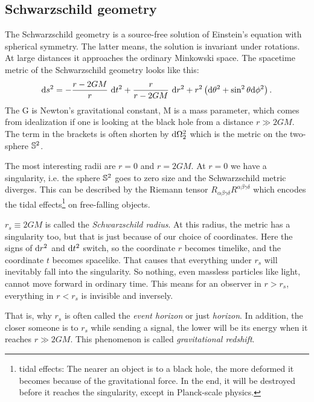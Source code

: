 \subsection{Schwarzschild geometry \checkmark}
	
	The Schwarzschild geometry is a source-free solution of Einstein's equation  with spherical symmetry. The latter means, the solution is invariant under rotations. 
	At large distances it approaches the ordinary Minkowski space.
	The spacetime metric of the Schwarzschild geometry looks like this:\\
		\begin{equation} \label{p.3 (2.1)}
		\mathrm{d} s^2=-\frac{r-2GM}{r}~ \mathrm{d} t^2+\frac{r}{r-2GM}~
		\mathrm{d} r^2+r^2 \left( \mathrm{d} \theta^2+\sin^2\theta \mathrm{d} \phi^2 \right).
		\end{equation}
	The G is Newton's gravitational constant, M is a mass parameter, which comes from idealization if one is looking at the black hole from a distance $r\gg 2GM$.
	The term in the brackets is often shorten by $\mathrm{d} \Omega_2^2$ which is the metric on the two-sphere $\mathbb{S}^2$.
	
	The most interesting radii are $r=0$ and $r=2GM$.
	At $r=0$ we have a singularity, i.e. the sphere $\mathbb{S}^2$ goes to zero size and the Schwarzschild metric diverges.
	This can be described by the Riemann tensor $R_{\alpha\beta\gamma \delta}R^{\alpha\beta\gamma\delta}$ which encodes the tidal effects\footnote{tidal effects: The nearer an object is to a black hole, the more deformed it becomes because of the gravitational force. In the end, it will be destroyed before it reaches the singularity, except in Planck-scale physics.} on free-falling objects.
	
	$r_{s}\equiv 2GM$ is called the \textit{Schwarzschild radius}. At this radius, the metric has a singularity too, but that is just because of our choice of coordinates. Here the signs of $\mathrm{d} r^2$ and $\mathrm{d} t^2$ switch, so the coordinate $r$ becomes timelike, and the coordinate $t$ becomes spacelike. That causes that everything under $r_{s}$ will inevitably fall into the singularity. 
	So nothing, even massless particles like light, cannot move forward in ordinary time. This means for an observer in $r>r_{s}$, everything in $r<r_{s}$ is invisible and inversely. 
	
	That is, why $r_{s}$ is often called the \textit{event horizon} or just \textit{horizon}.
	In addition, the closer someone is to $r_{s}$ while sending a signal, the lower will be its energy when it reaches $r\gg 2GM$. This phenomenon is called \textit{gravitational redshift}.
